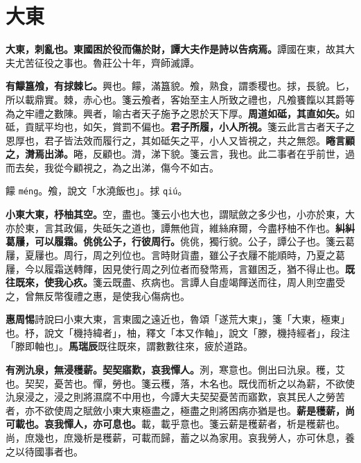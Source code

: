 \section{大東}


\textbf{大東，刺亂也。東國困於役而傷於財，譚大夫作是詩以告病焉。}{\footnotesize 譚國在東，故其大夫尤苦征役之事也。魯莊公十年，齊師滅譚。}

\textbf{有饛簋飧，有捄棘匕。}{\footnotesize 興也。饛，滿簋貌。飧，熟食，謂黍稷也。捄，長貌。匕，所以載鼎實。棘，赤心也。箋云飧者，客始至主人所致之禮也，凡飧饔餼以其爵等為之牢禮之數陳。興者，喻古者天子施予之恩於天下厚。}\textbf{周道如砥，其直如矢。}{\footnotesize 如砥，貢賦平均也，如矢，賞罰不偏也。}\textbf{君子所履，小人所視。}{\footnotesize 箋云此言古者天子之恩厚也，君子皆法效而履行之，其如砥矢之平，小人又皆視之，共之無怨。}\textbf{睠言顧之，潸焉出涕。}{\footnotesize 睠，反顧也。潸，涕下貌。箋云言，我也。此二事者在乎前世，過而去矣，我從今顧視之，為之出涕，傷今不如古。}

\begin{quoting}饛 \texttt{méng}。飧，說文「水澆飯也」。捄 \texttt{qiú}。\end{quoting}

\textbf{小東大東，杼柚其空。}{\footnotesize 空，盡也。箋云小也大也，謂賦斂之多少也，小亦於東，大亦於東，言其政偏，失砥矢之道也，譚無他貨，維絲麻爾，今盡杼柚不作也。}\textbf{糾糾葛屨，可以履霜。佻佻公子，行彼周行。}{\footnotesize 佻佻，獨行貌。公子，譚公子也。箋云葛屨，夏屨也。周行，周之列位也。言時財貨盡，雖公子衣屨不能順時，乃夏之葛屨，今以履霜送轉餫，因見使行周之列位者而發幣焉，言雖困乏，猶不得止也。}\textbf{既往既來，使我心疚。}{\footnotesize 箋云既盡、疚病也。言譚人自虛竭餫送而往，周人則空盡受之，曾無反幣復禮之惠，是使我心傷病也。}

\begin{quoting}\textbf{惠周惕}詩說曰小東大東，言東國之遠近也，魯頌「遂荒大東」，箋「大東，極東」也。杼，說文「機持緯者」，柚，釋文「本又作軸」，說文「滕，機持經者」，段注「滕即軸也」。\textbf{馬瑞辰}既往既來，謂數數往來，疲於道路。\end{quoting}

\textbf{有洌氿泉，無浸穫薪。契契寤歎，哀我憚人。}{\footnotesize 洌，寒意也。側出曰氿泉。穫，艾也。契契，憂苦也。憚，勞也。箋云穫，落，木名也。既伐而析之以為薪，不欲使氿泉浸之，浸之則將濕腐不中用也，今譚大夫契契憂苦而寤歎，哀其民人之勞苦者，亦不欲使周之賦斂小東大東極盡之，極盡之則將困病亦猶是也。}\textbf{薪是穫薪，尚可載也。哀我憚人，亦可息也。}{\footnotesize 載，載乎意也。箋云薪是穫薪者，析是穫薪也。尚，庶幾也，庶幾析是穫薪，可載而歸，蓄之以為家用。哀我勞人，亦可休息，養之以待國事者也。}

